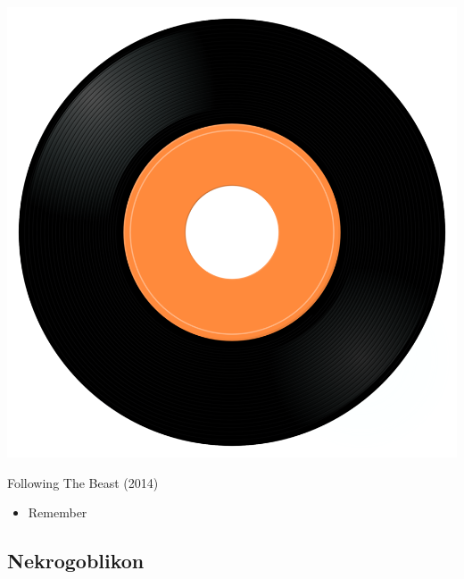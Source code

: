 \begin{minipage}[t]{0.25\textwidth}\vspace{0pt}
\captionsetup{type=figure}
\includegraphics[width=\textwidth]{Images/cover.png}
\caption*{Following The Beast (2014)}
\end{minipage}
\begin{minipage}[t]{0.25\textwidth}\vspace{0pt}
\begin{itemize}[nosep,leftmargin=1em,labelwidth=*,align=left]
	\setlength{\itemsep}{0pt}
	\item Remember
\end{itemize}
\end{minipage}

\subsection{Nekrogoblikon}

